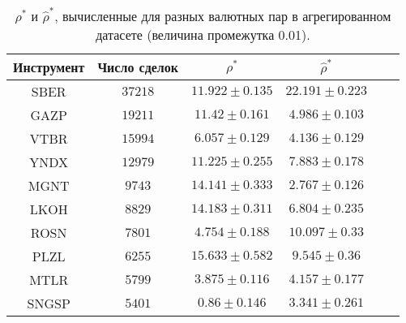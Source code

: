 \begin{table}[h!]
    \begin{center}
        \begin{tabular}{|c|c|c|c|c|c|}
            \hline
            Инструмент & Число сделок & $\rho^*$ & $\hat \rho^*$            \\ \hline
            SBER & $37218$ & $11.922 \pm 0.135$ & $22.191 \pm 0.223$ \\ \hline
            GAZP       & $19211$      & $11.42 \pm 0.161$  & $4.986 \pm 0.103$ \\ \hline
            VTBR       & $15994$      & $6.057 \pm 0.129$  & $4.136 \pm 0.129$ \\ \hline
            YNDX       & $12979$      & $11.225 \pm 0.255$ & $7.883 \pm 0.178$ \\ \hline
            MGNT       & $9743$       & $14.141 \pm 0.333$ & $2.767 \pm 0.126$ \\ \hline
            LKOH       & $8829$       & $14.183 \pm 0.311$ & $6.804 \pm 0.235$ \\ \hline
            ROSN       & $7801$       & $4.754 \pm 0.188$  & $10.097 \pm 0.33$ \\ \hline
            PLZL       & $6255$       & $15.633 \pm 0.582$ & $9.545 \pm 0.36$  \\ \hline
            MTLR       & $5799$       & $3.875 \pm 0.116$  & $4.157 \pm 0.177$ \\ \hline
            SNGSP      & $5401$       & $0.86 \pm 0.146$   & $3.341 \pm 0.261$ \\ \hline
        \end{tabular}
    \end{center}\caption{$\rho^*$ и $\hat \rho^*$, вычисленные для разных валютных пар в агрегированном датасете (величина промежутка 0.01).}
    \label{Aggreg1CU0.01} \end{table}

